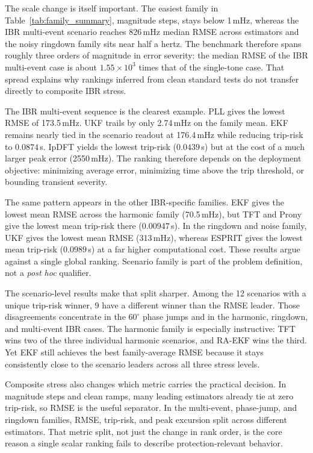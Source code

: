 The scale change is itself important. The easiest family in
Table~\ref{tab:family_summary}, magnitude steps, stays below 1\,mHz, whereas
the IBR multi-event scenario reaches 826\,mHz median RMSE across estimators and
the noisy ringdown family sits near half a hertz. The benchmark therefore spans
roughly three orders of magnitude in error severity: the median RMSE of the
IBR multi-event case is about $1.55\times10^3$ times that of the single-tone
case. That spread explains why rankings inferred from clean standard tests do
not transfer directly to composite IBR stress.

The IBR multi-event sequence is the clearest example. PLL gives the lowest RMSE
of 173.5\,mHz. UKF trails by only 2.74\,mHz on the family mean. EKF remains
nearly tied in the scenario readout at 176.4\,mHz while reducing trip-risk to
$0.0874$\,s. IpDFT yields the lowest trip-risk ($0.0439$\,s) but at the cost
of a much larger peak error (2550\,mHz). The
ranking therefore depends on the deployment objective: minimizing average error,
minimizing time above the trip threshold, or bounding transient severity.

The same pattern appears in the other IBR-specific families. EKF gives the
lowest mean RMSE across the harmonic family (70.5\,mHz), but TFT and Prony
give the lowest mean trip-risk there ($0.00947$\,s). In the ringdown and noise
family, UKF gives the lowest mean RMSE (313\,mHz), whereas ESPRIT gives the
lowest mean trip-risk ($0.0989$\,s) at a far higher computational cost. These
results argue against a single global ranking. Scenario family is part of
the problem definition, not a \emph{post hoc} qualifier.

The scenario-level results make that split sharper. Among the 12 scenarios with a unique
trip-risk winner, 9 have a different winner than the RMSE leader. Those
disagreements concentrate in the $60^\circ$ phase jumps and in the harmonic,
ringdown, and multi-event IBR cases. The harmonic family is especially
instructive: TFT wins two of the three individual harmonic scenarios, and
RA-EKF wins the third. Yet EKF still achieves the best family-average RMSE
because it stays consistently close to the scenario leaders across all three
stress levels.

Composite stress also changes which metric carries the practical decision. In
magnitude steps and clean ramps, many leading estimators already tie at zero
trip-risk, so RMSE is the useful separator. In the multi-event, phase-jump, and
ringdown families, RMSE, trip-risk, and peak excursion split across different
estimators. That metric split, not just the change in rank order, is the core
reason a single scalar ranking fails to describe protection-relevant
behavior.

